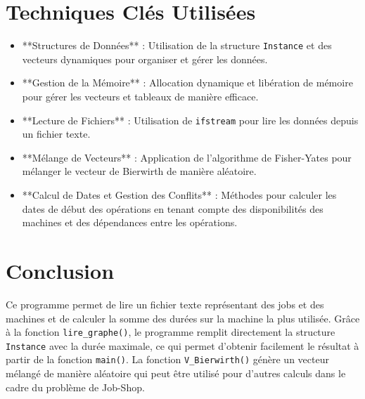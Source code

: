 \documentclass[a4paper,12pt]{article}
\begin{document}
\section{Techniques Clés Utilisées}

\begin{itemize}
    \item **Structures de Données** : Utilisation de la structure \texttt{Instance} et des vecteurs dynamiques pour organiser et gérer les données.
    \item **Gestion de la Mémoire** : Allocation dynamique et libération de mémoire pour gérer les vecteurs et tableaux de manière efficace.
    \item **Lecture de Fichiers** : Utilisation de \texttt{ifstream} pour lire les données depuis un fichier texte.
    \item **Mélange de Vecteurs** : Application de l'algorithme de Fisher-Yates pour mélanger le vecteur de Bierwirth de manière aléatoire.
    \item **Calcul de Dates et Gestion des Conflits** : Méthodes pour calculer les dates de début des opérations en tenant compte des disponibilités des machines et des dépendances entre les opérations.
\end{itemize}

\section{Conclusion}

Ce programme permet de lire un fichier texte représentant des jobs et des machines et de calculer la somme des durées sur la machine la plus utilisée. Grâce à la fonction \texttt{lire\_graphe()}, le programme remplit directement la structure \texttt{Instance} avec la durée maximale, ce qui permet d'obtenir facilement le résultat à partir de la fonction \texttt{main()}. La fonction \texttt{V\_Bierwirth()} génère un vecteur mélangé de manière aléatoire qui peut être utilisé pour d'autres calculs dans le cadre du problème de Job-Shop.
\end{document}
